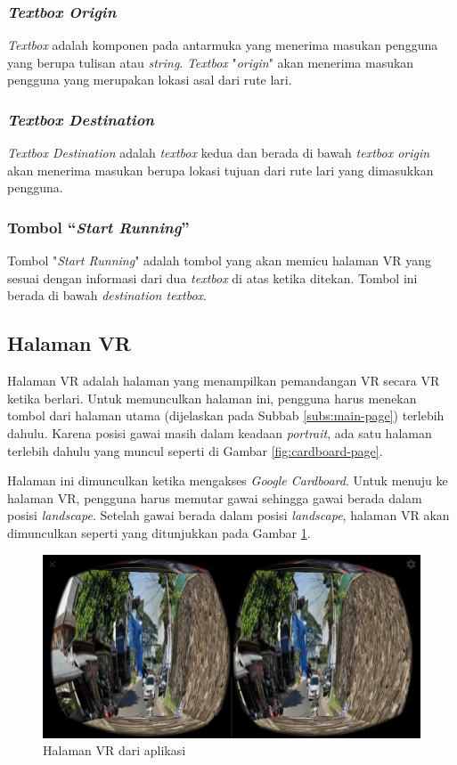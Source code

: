 \subsubsection{\textit{Textbox Origin}} 
\textit{Textbox} adalah komponen pada antarmuka yang menerima masukan pengguna yang berupa tulisan atau \textit{string}. \textit{Textbox} "\textit{origin}" akan menerima masukan pengguna yang merupakan lokasi asal dari rute lari.

\subsubsection{\textit{Textbox Destination}}
\textit{Textbox Destination} adalah \textit{textbox} kedua dan berada di bawah \textit{textbox origin}  akan menerima masukan berupa lokasi tujuan dari rute lari yang dimasukkan pengguna.   

\subsubsection{Tombol ``\textit{Start Running}''}
Tombol "\textit{Start Running}" adalah tombol yang akan memicu halaman VR yang sesuai dengan informasi dari dua \textit{textbox} di atas ketika ditekan. Tombol ini berada di bawah \textit{destination textbox}.

\subsection{Halaman VR}
Halaman VR adalah halaman yang menampilkan pemandangan VR secara VR ketika berlari. Untuk memunculkan halaman ini, pengguna harus menekan tombol dari halaman utama (dijelaskan pada Subbab \ref{subs:main-page}) terlebih dahulu. Karena posisi gawai masih dalam keadaan \textit{portrait}, ada satu halaman terlebih dahulu yang muncul seperti di Gambar \ref{fig:cardboard-page}. 

Halaman ini dimunculkan ketika mengakses \textit{Google Cardboard}. Untuk menuju ke halaman VR, pengguna harus memutar gawai sehingga gawai berada dalam posisi \textit{landscape}. Setelah gawai berada dalam posisi \textit{landscape}, halaman VR akan dimunculkan seperti yang ditunjukkan pada Gambar \ref{fig:vr-page}.

\begin{figure}[h]
	\centering
		\includegraphics[scale=0.4]{Gambar/vr-page.png}
	\caption{Halaman VR dari aplikasi}
	\label{fig:vr-page}
\end{figure}

